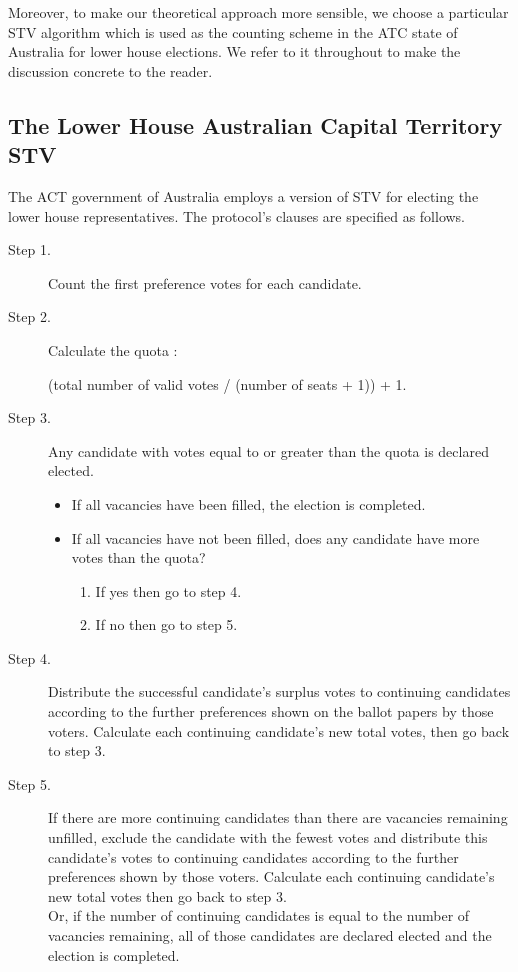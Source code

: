 \documentclass{llncs}
\begin{document}
Moreover, to make our theoretical approach more sensible, we choose a particular STV algorithm which is used as the counting scheme in the ATC state of Australia for lower house elections. We refer to it throughout to make the discussion concrete to the reader.

\subsection{The Lower House Australian Capital Territory STV}
The ACT government of Australia employs a version of STV for electing the lower house representatives\cite{}. The protocol's clauses are specified as follows.
\begin{description}
\item[Step 1.] Count the first preference votes for each candidate.
\item[Step 2.] Calculate the quota : 
\begin{center}
(total number of valid votes / (number of seats + 1)) + 1.
\end{center}
\item[Step 3.] Any candidate with votes equal to or greater than the quota is declared elected.
\begin{itemize}
\item If all vacancies have been filled, the election is completed.
\item If all vacancies have not been filled, does any candidate have more votes than the quota?
\begin{enumerate}
\item If yes then go to step 4.
\item If no then go to step 5.
\end{enumerate}
\end{itemize}
\item[Step 4.] Distribute the successful candidate's surplus votes to continuing candidates according to the further preferences shown on the ballot papers by those voters.  Calculate each continuing candidate's new total votes, then go back to step 3.
\item [Step 5.] If there are more continuing candidates than there are vacancies remaining unfilled, exclude the candidate with the fewest votes and distribute this candidate's votes to continuing candidates according to the further preferences shown by those voters. Calculate each continuing candidate's new total votes then go back to step 3.\\ Or, if the number of continuing candidates is equal to the number of vacancies remaining, all of those candidates are declared elected and the election is completed.
\end{description} 
\end{document}
